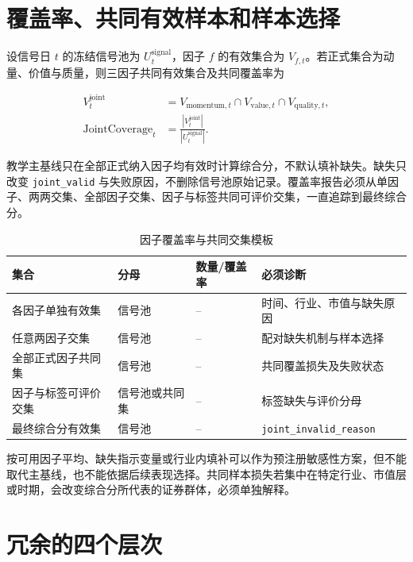 \section{覆盖率、共同有效样本和样本选择}

设信号日 \(t\) 的冻结信号池为 \(U^{\mathrm{signal}}_t\)，因子 \(f\) 的有效集合为 \(V_{f,t}\)。若正式集合为动量、价值与质量，则三因子共同有效集合及共同覆盖率为

\begin{align}
  V^{\mathrm{joint}}_t
  &= V_{\mathrm{momentum},t}
     \cap V_{\mathrm{value},t}
     \cap V_{\mathrm{quality},t},
  \label{eq:ch08-joint-set}\\
  \operatorname{JointCoverage}_t
  &= \frac{\left|V^{\mathrm{joint}}_t\right|}
           {\left|U^{\mathrm{signal}}_t\right|}.
  \label{eq:ch08-joint-coverage}
\end{align}

教学主基线只在全部正式纳入因子均有效时计算综合分，不默认填补缺失。缺失只改变 \texttt{joint\_valid} 与失败原因，不删除信号池原始记录。覆盖率报告必须从单因子、两两交集、全部因子交集、因子与标签共同可评价交集，一直追踪到最终综合分。

\begin{table}[htbp]
  \centering
  \small
  \caption{因子覆盖率与共同交集模板}
  \label{tab:ch08-coverage-template}
  \begin{tabularx}{\textwidth}{p{4.0cm} p{3.2cm} p{2.7cm} Y}
    \toprule
    集合 & 分母 & 数量/覆盖率 & 必须诊断 \\
    \midrule
    各因子单独有效集 & 信号池 & -- & 时间、行业、市值与缺失原因 \\
    任意两因子交集 & 信号池 & -- & 配对缺失机制与样本选择 \\
    全部正式因子共同集 & 信号池 & -- & 共同覆盖损失及失败状态 \\
    因子与标签可评价交集 & 信号池或共同集 & -- & 标签缺失与评价分母 \\
    最终综合分有效集 & 信号池 & -- & \texttt{joint\_invalid\_reason} \\
    \bottomrule
  \end{tabularx}
\end{table}

按可用因子平均、缺失指示变量或行业内填补可以作为预注册敏感性方案，但不能取代主基线，也不能依据后续表现选择。共同样本损失若集中在特定行业、市值层或时期，会改变综合分所代表的证券群体，必须单独解释。

\section{冗余的四个层次}

